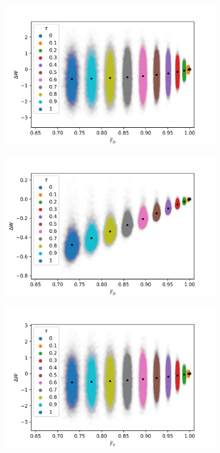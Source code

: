 \begin{figure}
	\centering
	\begin{subfigure}{0.4\textwidth}
		\centering
		\includegraphics[width=\textwidth]{img/noisy_drive_bi_true_3}
	\end{subfigure}
	\begin{subfigure}{0.4\textwidth}
	\centering
	\includegraphics[width=\textwidth]{img/noisy_drive_dt_1}
	\end{subfigure}
	\begin{subfigure}{0.4\textwidth}
		\centering
		\includegraphics[width=\textwidth]{img/noisy_trans_bi_true_3}

\end{subfigure}
\end{figure}
